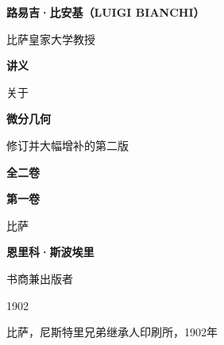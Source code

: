 

\thispagestyle{empty}

\begin{center}
{\bfseries 路易吉·比安基（LUIGI BIANCHI）}\par
{\small 比萨皇家大学教授}\par
\vspace{1.5em}
{\Huge\bfseries 讲义}\par
\vspace{1em}
关于\par
\vspace{1em}
{\LARGE\bfseries 微分几何}\par
\vspace{1em}
修订并大幅增补的第二版\par
{\bfseries 全二卷}\par
\vspace{1.25em}
{\large\bfseries 第一卷}\par
\vspace{4em}
{\large 比萨}\par
{\bfseries 恩里科·斯波埃里}\par
{\scriptsize 书商兼出版者}\par
1902
\end{center}

\begin{center}
{\small 比萨，尼斯特里兄弟继承人印刷所，1902年}
\end{center}

\clearpage
